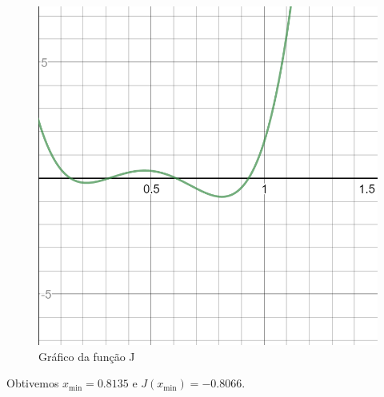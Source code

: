 \documentclass[12pt]{article}
\newenvironment{exercise}[2][Exercício]{\begin{trivlist}
\item[\hskip \labelsep {\bfseries #1}\hskip \labelsep {\bfseries #2.}]}{\end{trivlist}}
\begin{document}
\begin{exercise}{4}
\begin{figure}[H]
  \centering
  \includegraphics[width=12cm]{figs/j_04.png}
  \caption{Gráfico da função J}
  \label{fig:j04} 
\end{figure}
 
Obtivemos $x_{\text{min}} = 0.8135$ e $J(x_{\text{min}}) = -0.8066$.
 

\end{exercise}
\end{document}
